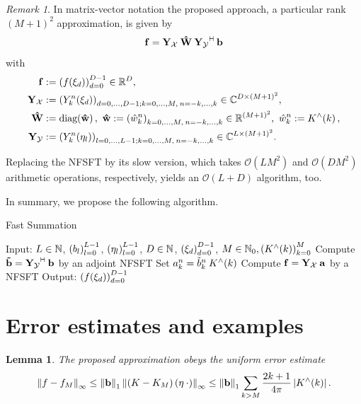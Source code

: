 \documentclass[11pt,a4paper,twoside,bibtotoc]{scrartcl}
\theoremstyle{plain}
\newtheorem{lemma}[theorem]{Lemma}
\theoremstyle{definition}
\theoremstyle{remark}
\newtheorem{remark}[theorem]{Remark}
\newcommand{\adj}{{\vdash \hspace*{-1.72mm} \dashv}}
\numberwithin{equation}{section}
\numberwithin{table}{section}
\numberwithin{figure}{section}
\begin{document}
\begin{remark}
In matrix-vector notation the proposed approach, a particular rank $(M+1)^2$
approximation, is given by
\[
  \V{f} = \V{Y_{\mathcal{X}}} \: \V{\hat W} \:
  \V{Y_{\mathcal{Y}}}^{\adj} \: \V{b}
\]
with
\begin{align}
  \nonumber
  \mathbf{f} & := \left(f{\hspace{-0.4ex}}\left(\mathbf{\xi}_{d}\right)\right)_{d=0}^{D-1} \in \mathbb{R}^D,
  \\ \nonumber
  \mathbf{Y_{\mathcal{X}}} & := \left(Y_k^n{\hspace{-0.4ex}}\left(\mathbf{\xi}_{d}\right)\right)_{d=0,\ldots,D-1;
  k=0,\ldots,M,\:n=-k,\ldots,k} \in \mathbb{C}^{D \times
  \left(M+1\right)^2}, \\ \nonumber
  \mathbf{\hat W} & := \text{\rm{diag}}{\hspace{-0.4ex}}\left(\mathbf{\hat w}\right),\ \mathbf{\hat w} := \left(\hat
  w_{k}^{n}\right)_{k=0,\ldots,M,\:n=-k,\ldots,k} \in \mathbb{R}^{(M+1)^2},\ \hat w_{k}^n :=
  K^{\wedge}{\hspace{-0.4ex}}\left(k\right), \\ \nonumber
  \mathbf{Y_{\mathcal{Y}}} & := \left(Y_k^n{\hspace{-0.4ex}}\left(\mathbf{\eta}_{l}\right)\right)_{l=0,\ldots,L-1;
  k=0,\ldots,M,\:n=-k,\ldots,k} \in \mathbb{C}^{L \times \left(M+1\right)^2}.
\end{align}

Replacing the NFSFT by its slow version, which takes $\mathcal{O}(L M^2)$ and
$\mathcal{O}(D M^2)$ arithmetic operations, respectively, yields an
$\mathcal{O}(L+D)$ algorithm, too.
\end{remark}

In summary, we propose the following algorithm.
\begin{algorithm}[h]
  \caption{Fast Summation}
  \label{Applications:Algorithm:FastSummation}    
  \begin{algorithmic}
    \STATE  Input:  $L \in \mathbb{N}$, $\left(b_{l}\right)_{l=0}^{L-1}$, $\left(\mathbf{\eta}_{l}\right)_{l=0}^{L-1}$, 
                    $D \in \mathbb{N}$, $\left(\mathbf{\xi}_{d}\right)_{d=0}^{D-1}$, $M \in \mathbb{N}_{0}, \left(K^{\wedge}{\hspace{-0.4ex}}\left(k\right)\right)_{k=0}^M$
    \STATE
    \STATE Compute $\V{\tilde{b}}= \V{Y_{\mathcal{Y}}}^{\adj} \: \V{b}$ by an
                    adjoint NFSFT 
    \STATE 
        \STATE Set $a_{k}^n = \tilde{b}_{k}^n \: K^{\wedge}{\hspace{-0.4ex}}\left(k\right)$
      \ENDFOR
    \ENDFOR
    \STATE
    \STATE Compute $\mathbf{f} = \mathbf{Y_{\mathcal{X}}} \: \mathbf{a}$ by a NFSFT
    \STATE
    \STATE Output: $\left(f{\hspace{-0.4ex}}\left(\mathbf{\xi}_{d}\right)\right)_{d=0}^{D-1}$
\end{algorithmic}
\end{algorithm}


\section{Error estimates and examples}\label{Basics:SphericalKernels}
\begin{lemma}\label{lemma:error}
  The proposed approximation obeys the uniform error estimate
  \begin{equation}
    \left\|f - f_{M}\right\|_{\infty} \le
    \left\|\mathbf{b}\right\|_1 \left\|\left(K-K_M\right){\hspace{-0.4ex}}\left(\mathbf{\eta} \: \cdot
      \right)\right\|_{\infty} \le \left\|\mathbf{b}\right\|_1 \sum_{k>M}
    \frac{2k+1}{4\pi} \left\vert K^{\wedge}{\hspace{-0.4ex}}\left(k\right)\right\vert.
  \end{equation}
\end{lemma}
\end{document}
